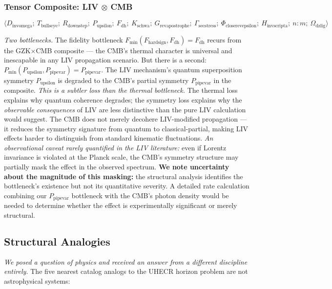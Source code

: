 \documentclass[12pt,a4paper]{article}
\begin{document}
\subsubsection{Tensor Composite: LIV $\otimes$ CMB}

\[\langle D_{\text{invomega}};\ T_{\text{bullseye}};\ R_{\text{downstep}};\ P_{\text{upsilon}};\ F_{\text{dh}};\ K_{\text{schwa}};\ G_{\text{revapostrophe}};\ \Gamma_{\text{secstress}};\ \Phi_{\text{closerevepsilon}};\ H_{\text{invscripta}};\ n{:}m;\ \Omega_{\text{dzlig}} \rangle\]

\emph{Two bottlenecks.} The fidelity bottleneck $F_{\min}(F_{\text{hardsign}}, F_{\text{dh}}) = F_{\text{dh}}$ recurs from the GZK$\times$CMB composite --- the CMB's thermal character is universal and inescapable in any LIV propagation scenario. But there is a second: $P_{\min}(P_{\text{upsilon}}, P_{\text{pipevar}}) = P_{\text{pipevar}}$. The LIV mechanism's quantum superposition symmetry $P_{\text{upsilon}}$ is degraded to the CMB's partial symmetry $P_{\text{pipevar}}$ in the composite. \emph{This is a subtler loss than the thermal bottleneck.} The thermal loss explains why quantum coherence degrades; the symmetry loss explains why the \emph{observable consequences} of LIV are less distinctive than the pure LIV calculation would suggest. The CMB does not merely decohere LIV-modified propagation --- it reduces the symmetry signature from quantum to classical-partial, making LIV effects harder to distinguish from standard kinematic fluctuations. \emph{An observational caveat rarely quantified in the LIV literature:} even if Lorentz invariance is violated at the Planck scale, the CMB's symmetry structure may partially mask the effect in the observed spectrum. \textbf{We note uncertainty about the magnitude of this masking:} the structural analysis identifies the bottleneck's existence but not its quantitative severity. A detailed rate calculation combining our $P_{\text{pipevar}}$ bottleneck with the CMB's photon density would be needed to determine whether the effect is experimentally significant or merely structural.

\subsection{Structural Analogies}

\emph{We posed a question of physics and received an answer from a different discipline entirely.} The five nearest catalog analogs to the UHECR horizon problem are not astrophysical systems:
\end{document}
